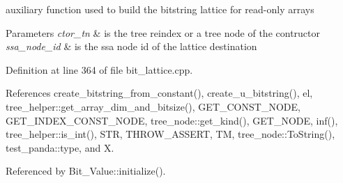 auxiliary function used to build the bitstring lattice for read-\/only arrays 


\begin{DoxyParams}{Parameters}
{\em ctor\+\_\+tn} & is the tree reindex or a tree node of the contructor \\
\hline
{\em ssa\+\_\+node\+\_\+id} & is the ssa node id of the lattice destination \\
\hline
\end{DoxyParams}


Definition at line 364 of file bit\+\_\+lattice.\+cpp.



References create\+\_\+bitstring\+\_\+from\+\_\+constant(), create\+\_\+u\+\_\+bitstring(), el, tree\+\_\+helper\+::get\+\_\+array\+\_\+dim\+\_\+and\+\_\+bitsize(), G\+E\+T\+\_\+\+C\+O\+N\+S\+T\+\_\+\+N\+O\+DE, G\+E\+T\+\_\+\+I\+N\+D\+E\+X\+\_\+\+C\+O\+N\+S\+T\+\_\+\+N\+O\+DE, tree\+\_\+node\+::get\+\_\+kind(), G\+E\+T\+\_\+\+N\+O\+DE, inf(), tree\+\_\+helper\+::is\+\_\+int(), S\+TR, T\+H\+R\+O\+W\+\_\+\+A\+S\+S\+E\+RT, TM, tree\+\_\+node\+::\+To\+String(), test\+\_\+panda\+::type, and X.



Referenced by Bit\+\_\+\+Value\+::initialize().


